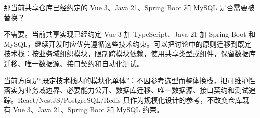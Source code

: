 \documentclass[UTF8,a4paper,11pt]{ctexart}
\begin{document}
\begin{membermsg}
那当前共享仓库已经约定的 Vue 3、Java 21、Spring Boot 和 MySQL 是否需要被替换？
\end{membermsg}

\begin{gptmsg}
不需要。当前共享实现已经约定 Vue 3 加 TypeScript、Java 21 加 Spring Boot 和 MySQL，继续开发时应优先遵循这些技术约束。可以把讨论中的原则迁移到既定技术栈：按业务域组织模块，限制跨模块依赖，使用共享类型或组件，保留数据库迁移、唯一数据源、接口契约和自动化测试。
\end{gptmsg}

\begin{decisionbox}
当前方向是“既定技术栈内的模块化单体”：不因参考选型而整体换栈，把可维护性落实为业务域边界、必要能力公开、数据库迁移、唯一数据源、接口契约和测试追踪。React/NestJS/PostgreSQL/Redis 只作为规模化设计的参考，不改变仓库既有 Vue 3、Java 21、Spring Boot 和 MySQL 约束。
\end{decisionbox}
\end{document}
